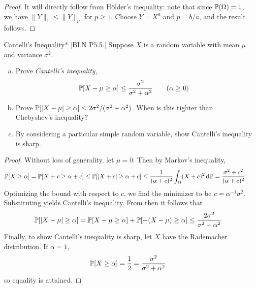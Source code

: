 \begin{proof}
    It will directly follow from H\"older's inequality: note that since \(\mathbb{P}(\Omega) = 1\), we have \(\|Y\|_1 \leq \|Y\|_p\) for \(p \geq 1\). Choose \(Y = X^a\) and \(p = b/a\), and the result follows.
\end{proof}


\begin{problem}{Cantelli's Inequality}*
    [BLN P5.5.] Suppose \(X\) is a random variable with mean \(\mu\) and variance \(\sigma^2\).
    \begin{enumerate}[(a)]
        \itemsep0em
        \item Prove \emph{Cantelli's inequality},
        \[
            \mathbb{P}[X - \mu \geq \alpha] \leq \frac{\sigma^2}{\sigma^2 + \alpha^2}
            \qquad (\alpha \geq 0)
        \]
        \item Prove \(\mathbb{P}[|X - \mu| \geq \alpha] \leq 2\sigma^2 / (\sigma^2 + \alpha^2)\). When is this tighter than Chebyshev's inequality?
        \item By considering a particular simple random variable, show Cantelli's inequality is sharp.
    \end{enumerate}
\end{problem}

\begin{proof}
    Without loss of generality, let \(\mu = 0\). Then by Markov's inequality,
    \begin{align*}
        \mathbb{P}[X \geq \alpha]
        &= \mathbb{P}[X + c \geq \alpha + c]
        \leq \mathbb{P}[|X + c| \geq \alpha + c]
        \leq \frac{1}{(\alpha + c)^2} \int_{\Omega} (X + c)^2 \, \mathrm{d}\mathbb{P}
        = \frac{\sigma^2 + c^2}{(\alpha + c)^2}
    \end{align*}
    Optimizing the bound with respect to \(c\), we find the minimizer to be \(c = \alpha^{-1} \sigma^2\). Substituting yields Cantelli's inequality. From then it follows that
    \[
        \mathbb{P}[|X - \mu| \geq \alpha]
        = \mathbb{P}[X - \mu \geq \alpha] + \mathbb{P}[-(X - \mu) \geq \alpha]
        \leq \frac{2\sigma^2}{\sigma^2 + \alpha^2}
    \]
    Finally, to show Cantelli's inequality is sharp, let \(X\) have the Rademacher distribution. If \(\alpha = 1\),
    \[
        \mathbb{P}[X \geq \alpha] = \frac{1}{2} = \frac{\sigma^2}{\sigma^2 + \alpha^2}
    \]
    so equality is attained.
\end{proof}


